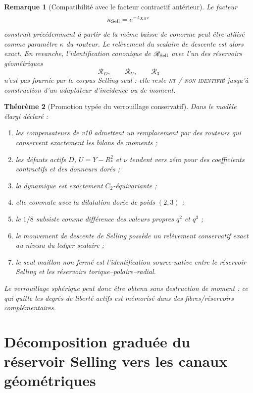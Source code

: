 \documentclass[11pt,a4paper]{article}
\newtheorem{theorem}{Théorème}[section]
\newtheorem{remark}[theorem]{Remarque}
\newcommand{\statusNT}{\textsc{nt / non identifié}}
\begin{document}
\begin{remark}[Compatibilité avec le facteur contractif antérieur]
Le facteur
\[
 \kappa_{\rm Sell}=e^{-4\chi_S\varepsilon}
\]
construit précédemment à partir de la même baisse de vonorme peut être utilisé comme paramètre $\kappa$ du routeur. Le relèvement du scalaire de descente est alors exact. En revanche, l'identification canonique de $\mathscr R_{\rm Sell}$ avec l'un des réservoirs géométriques
\[
 \mathscr R_D,\qquad
 \mathscr R_U,\qquad
 \mathscr R_3
\]
n'est pas fournie par le corpus Selling seul : elle reste \statusNT{} jusqu'à construction d'un adaptateur d'incidence ou de moment.
\end{remark}

\begin{theorem}[Promotion typée du verrouillage conservatif]\label{thm:v11-promotion}
Dans le modèle élargi déclaré :
\begin{enumerate}[label=\textup{(\roman*)}]
\item les compensateurs de v10 admettent un remplacement par des routeurs qui conservent exactement les bilans de moments ;
\item les défauts actifs $D$, $U=Y-R_*^2$ et $\nu$ tendent vers zéro pour des coefficients contractifs et des donneurs dorés ;
\item la dynamique est exactement $C_2$-équivariante ;
\item elle commute avec la dilatation dorée de poids $(2,3)$ ;
\item le $1/8$ subsiste comme différence des valeurs propres $q^2$ et $q^3$ ;
\item le mouvement de descente de Selling possède un relèvement conservatif exact au niveau du ledger scalaire ;
\item le seul maillon non fermé est l'identification source-native entre le réservoir Selling et les réservoirs torique--polaire--radial.
\end{enumerate}
Le verrouillage sphérique peut donc être obtenu sans destruction de moment : ce qui quitte les degrés de liberté actifs est mémorisé dans des fibres/réservoirs complémentaires.
\end{theorem}


\section{Décomposition graduée du réservoir Selling vers les canaux géométriques}\label{sec:v12-selling-graded-reservoir}
\end{document}
